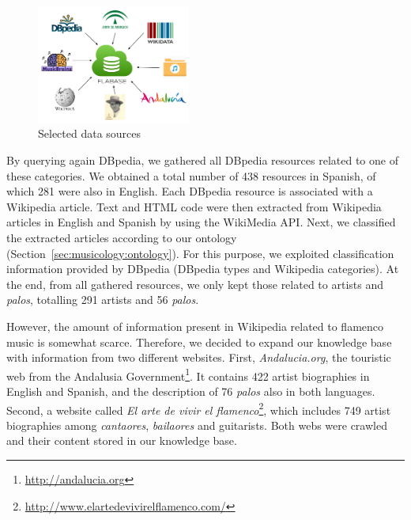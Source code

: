 \begin{figure}
	\centering
	\includegraphics[width=0.45\textwidth]{ch05_musicology_pics/datasources.png}
	\caption{Selected data sources \label{fig:musicology:datasources}}
\end{figure}

By querying again DBpedia, we gathered all DBpedia resources related to one of these categories. We obtained a total number of 438 resources in Spanish, of which 281 were also in English. Each DBpedia resource is associated with a Wikipedia article. Text and HTML code were then extracted from Wikipedia articles in English and Spanish by using the WikiMedia API. 
Next, we classified the extracted articles according to our ontology (Section~\ref{sec:musicology:ontology}). For this purpose, we exploited classification information provided by DBpedia (DBpedia types and Wikipedia categories). At the end, from all gathered resources, we only kept those related to artists and \textit{palos}, totalling  291 artists and 56 \textit{palos}.

However, the amount of information present in Wikipedia related to flamenco music is somewhat scarce. Therefore, we decided to expand our knowledge base with information from two different websites. First, \textit{Andalucia.org}, the touristic web from the Andalusia Government\footnote{\url{http://andalucia.org}}. It contains 422 artist biographies in English and Spanish, and the description of 76 \textit{palos} also in both languages. Second, a website called \textit{El arte de vivir el flamenco}\footnote{\url{http://www.elartedevivirelflamenco.com/}}, which includes 749 artist biographies among \textit{cantaores}, \textit{bailaores} and guitarists. Both webs were crawled and their content stored in our knowledge base. %

